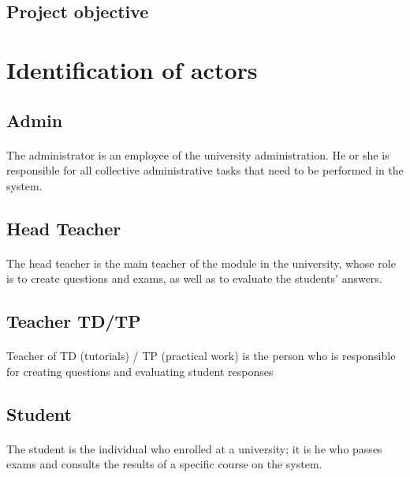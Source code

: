 \documentclass[]{uc2pfecaneva}
\begin{document}
    \subsection{Project objective}



    \raggedright\section{Identification of actors}
    \raggedright\subsection{Admin}
    \paragraph{}
    The administrator is an employee of the university administration. He or she is responsible for all collective administrative tasks that need to be performed in the system.

    \raggedright\subsection{Head Teacher}
    \paragraph{}
    The head teacher is the main teacher of the module in the university, whose role is to create questions and exams, as well as to evaluate the students' answers.

    \raggedright\subsection{Teacher TD/TP}
    \paragraph{}
    Teacher of TD (tutorials) / TP (practical work) is the person who is responsible for creating questions and evaluating student responses


    \raggedright\subsection{Student}
    \paragraph{}
    The student is the individual who enrolled at a university; it is he who passes exams and consults the results of a specific course on the system.
\end{document}

